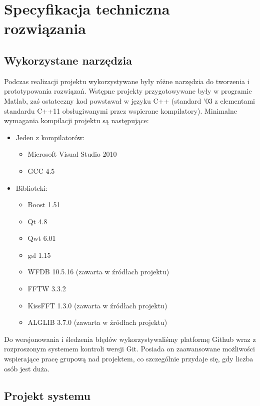 \documentclass[a4paper, 11pt]{article}
\begin{document}
\section{Specyfikacja techniczna rozwiązania}
\label{sec:techspec}

\subsection{Wykorzystane narzędzia}
\label{sec:tools}

Podczas realizacji projektu wykorzystywane były różne narzędzia do tworzenia i prototypowania rozwiązań. Wstępne projekty przygotowywane były w programie Matlab, zaś ostateczny kod powstawał w języku C++ (standard '03 z elementami standardu C++11 obsługiwanymi przez wspierane kompilatory).
Minimalne wymagania kompilacji projektu są następujące:
\begin{itemize}
  \item Jeden z kompilatorów:
  \begin{itemize}
    \item Microsoft Visual Studio 2010
    \item GCC 4.5
  \end{itemize}
  \item Biblioteki:
  \begin{itemize}
    \item Boost 1.51
    \item Qt 4.8
    \item Qwt 6.01
    \item gsl 1.15
    \item WFDB 10.5.16 (zawarta w źródłach projektu)
    \item FFTW 3.3.2
   \item KissFFT 1.3.0  (zawarta w źródłach projektu)
   \item ALGLIB 3.7.0   (zawarta w źródłach projektu)
  \end{itemize}
\end{itemize}

Do wersjonowania i śledzenia błędów wykorzystywaliśmy platformę Github wraz z rozproszonym systemem kontroli wersji Git. Posiada on zaawansowane możliwości wspierające pracę grupową nad projektem, co szczególnie przydaje się, gdy liczba osób jest duża.

\subsection{Projekt systemu}
\label{sec:sys_proj}
\end{document}
